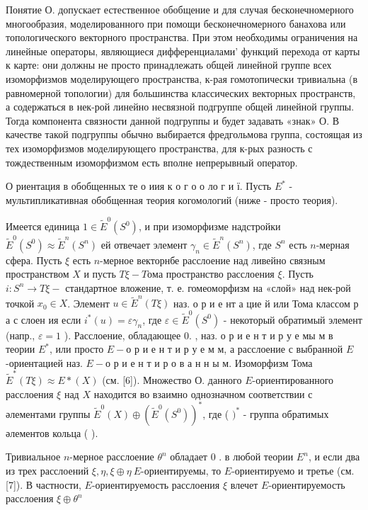 \documentclass[10pt]{article}
\begin{document}
Понятие О. допускает естественное обобщение и для случая бесконечномерного многообразия, моделированного при помощи бесконечномерного банахова или топологического векторного пространства. При этом необходимы ограничения на линейные операторы, являющиеся дифференциалами' функций перехода от карты к карте: они должны не просто принадлежать общей линейной группе всех изоморфизмов моделирующего пространства, к-рая гомотопически тривиальна (в равномерной топологии) для большинства классических векторных пространств, а содержаться в нек-рой линейно несвязной подгруппе общей линейной группы. Тогда компонента связности данной подгруппы и будет задавать «знак» О. В качестве такой подгруппы обычно выбирается фредгольмова группа, состоящая из тех изоморфизмов моделирующего пространства, для к-рых разность с тождественным изоморфизмом есть вполне непрерывный оператор.

О риентация в обобщенных те о иия к о г о о ло г и ї. Пусть $E^{*}$ - мультипликативная обобщенная теория когомологий (ниже - просто теория).

Имеется единица $1 \in \tilde{E}^{0}\left(S^{0}\right)$, и при изоморфизме надстройки $\tilde{E}^{0}\left(S^{0}\right) \approx \tilde{E}^{n}\left(S^{n}\right)$ ей отвечает элемент $\gamma_{n} \in \tilde{E}^{n}\left(S^{n}\right)$, где $S^{n}$ есть $n$-мерная сфера. Пусть $\xi$ есть $n$-мерное векторнбе расслоение над ливейно связным пространством $X$ и пусть $T \xi-T о м а$ пространство расслоения $\xi$. Пусть $i: S^{n} \rightarrow T \xi-$ стандартное вложение, т. е. гомеоморфизм на «слой» над нек-рой точкой $x_{0} \in X$. Элемент $u \in \tilde{E}^{n}(T \xi)$ наз. о р и е нт а цие й или Тома классом р а с слоен ия если $i^{*}(u)=\varepsilon \gamma_{n}$, где $\varepsilon \in \tilde{E}^{0}\left(S^{0}\right)$ - некоторый обратимый элемент (напр., $\varepsilon=1$ ). Расслоение, обладающее 0. , наз. о р и е н т и р у е мы м в теории $E^{*}$, или просто $E-о$ р и е н т и р у е м м, а расслоение с выбранной $E$-ориентацией наз. $E-о$ р и е н т и р о в а н н ы м. Изоморфизм Тома $\tilde{E}^{*}(T \xi) \approx E *(X)$ (см. [6]). Множество О. данного $E$-ориентированного расслоения $\xi$ над $X$ находится во взаимно однозначном соответствии с әлементами группы $\tilde{E}^{0}(X) \oplus\left(\tilde{E}^{0}\left(S^{0}\right)\right)^{*}$, где ( $)^{*}$ - группа обратимых әлементов кольца ( ).

Тривиальное $n$-мерное расслоение $\theta^{n}$ обладает 0 . в любой теории $E^{n}$, и если два из трех расслоений $\xi, \eta, \xi \oplus \eta ~ E$-ориентируемы, то $E$-ориентируемо и третье (см. [7]). В частности, $E$-ориентируемость расслоения $\xi$ влечет $E$-ориентируемость расслоения $\xi \oplus \theta^{n}$
\end{document}
